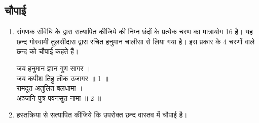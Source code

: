 	
\subsection{चौपाई}
\renewcommand{\theequation}{\theenumi}
\renewcommand{\thefigure}{\theenumi}
\begin{enumerate}[label=\thesubsection.\arabic*.,ref=\thesubsection.\theenumi]
\item  संगणक संविधि के द्वारा सत्यापित कीजिये की निम्न छंदों के प्रत्येक चरण का मात्रायोग 16 है।  यह छन्द गोस्वामी तुलसीदास द्वारा रचित हनुमान चालीसा से लिया गया है।   इस प्रकार के 4 चरणों वाले छन्द को चौपाई कहते हैं। 
\begin{center}
जय हनुमान ज्ञान गुण सागर ।
\\
जय कपीश तिहु लॊक उजागर ॥ 1 ॥
\\
रामदूत अतुलित बलधामा ।
\\
अञ्जनि पुत्र पवनसुत नामा ॥ 2 ॥
\end{center}
\item हस्तक्रिया से सत्यापित कीजिये कि उपरोक्त छन्द वास्तव में चौपाई है। 

\end{enumerate}
